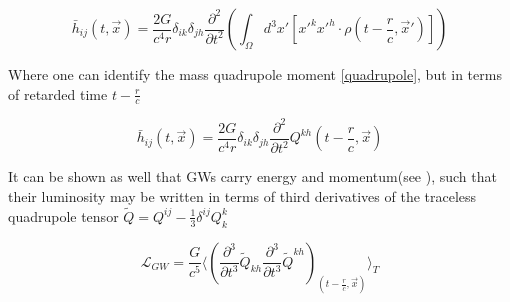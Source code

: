 \begin{equation}\label{source}
\bar{h}_{ij}(t, \vec{x}) = \frac{2 G}{c^4 r} \delta_{ik}  \delta_{jh}  \frac{\partial^2}{\partial t^2} \left(\int_{\Omega} d^3x' \left[ x'^k x'^h \cdot \rho\left(t-\frac{r}{c}, \vec{x}'\right)  \right] \right)
\end{equation}

Where one can identify the mass quadrupole moment \ref{quadrupole}, but in terms of retarded time $t-\frac{r}{c}$ 

\begin{equation}
\bar{h}_{ij}(t, \vec{x}) = \frac{2 G}{c^4 r} \delta_{ik}  \delta_{jh}  \frac{\partial^2}{\partial t^2} Q^{kh}\left(t-\frac{r}{c}, \vec{x}\right)
\end{equation}


It can be shown as well that GWs carry energy and momentum(see \cite{Maggiore:2007ulw}), such that their luminosity may be written in terms of third derivatives of the traceless quadrupole tensor $\tilde{Q} = Q^{ij} -  \frac{1}{3} \delta^{ij}Q^k_k$

\begin{equation}
\mathcal{L}_{GW} = \frac{G}{c^5} \Bigg\langle \left( \frac{\partial^3}{\partial t^3} \tilde{Q}_{kh} \frac{\partial^3}{\partial t^3} \tilde{Q}^{kh}\right)_{\left(t-\frac{r}{c}, \vec{x}\right)} \Bigg\rangle_T
\end{equation}

